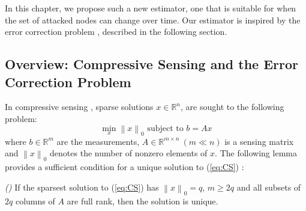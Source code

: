 \documentclass[../../thesis.tex]{subfiles}
\newcommand{\norm}[1]{\left\lVert#1\right\rVert}
\begin{document}
In this chapter, we propose such a new estimator, one that is suitable for when the set of attacked nodes can change over time. Our estimator is inspired by the error correction problem \cite{tao11}, described in the following section. %


\subsection{Overview: Compressive Sensing and the Error Correction Problem \cite{tao11}} \label{sec:error_correction}
In compressive sensing \cite{tao11}, sparse solutions $x\in \mathbb{R}^n$, are sought to the following problem:
\begin{equation}
	\min_x \norm{x}_0 \text{ subject to } b= Ax
	\label{eq:CS}
\end{equation}
where $b \in \mathbb{R}^m$ are the measurements, $A \in \mathbb{R}^{m\times n}~ (m \ll n)$ is a sensing matrix and $\norm{x}_0$ denotes the number of nonzero elements of $x$. The following lemma provides a sufficient condition for a unique solution to (\ref{eq:CS}) \cite{tao11}:

\begin{lem} \emph{(\hspace{1sp}\cite{David_Chang})} \label{lem:CS}
If the sparsest solution to (\ref{eq:CS}) has $\norm{x}_0 = q$, $m\ge 2q$ and all subsets of $2q$ columns of $A$ are full rank, then the solution is unique. 
\end{lem}
\end{document}
